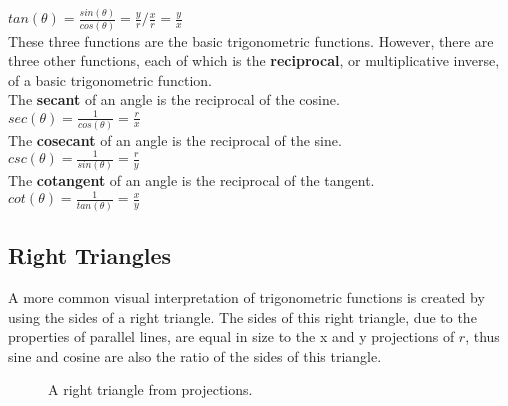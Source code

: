 \tab$tan(\theta)=\frac{sin(\theta)}{cos(\theta)} = \frac{y}{r}/\frac{x}{r} = \frac{y}{x}$\\

These three functions are the basic trigonometric functions.  However, there are three other functions, each of which is the {\bf reciprocal}, or multiplicative inverse, of a basic trigonometric function.\\

The {\bf secant} of an angle is the reciprocal of the cosine.\\

\tab$sec(\theta) = \frac{1}{cos(\theta)} = \frac{r}{x}$\\

The {\bf cosecant} of an angle is the reciprocal of the sine.\\

\tab$csc(\theta) = \frac{1}{sin(\theta)} = \frac{r}{y}$\\

The {\bf cotangent} of an angle is the reciprocal of the tangent.\\

\tab$cot(\theta) = \frac{1}{tan(\theta)} = \frac{x}{y}$\\

\newpage

\subsection{Right Triangles}
A more common visual interpretation of trigonometric functions is created by using the sides of a right triangle.  The sides of this right triangle, due to the properties of parallel lines, are equal in size to the x and y projections of $r$, thus sine and cosine are also the ratio of the sides of this triangle.\\

\begin{figure}[htb]
\center
\caption{A right triangle from projections.}
\label{fig:right_triangle_projections}
\end{figure}

